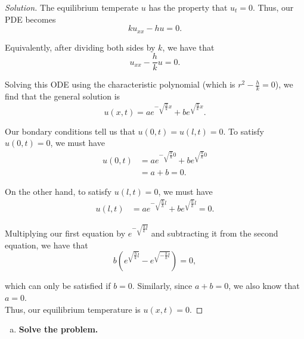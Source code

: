 \documentclass[11pt]{article}
\newenvironment{solution}
  {\renewcommand\qedsymbol{$\blacksquare$}\begin{proof}[Solution]}
  {\end{proof}}
\begin{document}
\begin{solution}
The equilibrium temperate $u$ has the property that $u_t = 0$. Thus, our PDE becomes
\[ ku_{xx} - hu = 0.\]

Equivalently, after dividing both sides by $k$, we have that \[ u_{xx} - \frac{h}{k} u = 0. \]

Solving this ODE using the characteristic polynomial (which is $r^2 - \frac{h}{k} = 0$), we find that the general solution is 
\[ u(x, t) = a e^{-\sqrt{\frac{h}{k}}x} + b e^{\sqrt{\frac{h}{k}}x}.\]

Our bondary conditions tell us that $u(0, t) = u(l, t) = 0$. To satisfy $u(0, t) = 0$, we must have
\begin{align*} u(0, t) &= a e^{-\sqrt{\frac{h}{k}}0} + b e^{\sqrt{\frac{h}{k}}0} \\
&= a + b = 0.\end{align*} 

On the other hand, to satisfy $u(l, t) = 0$, we must have
\begin{align*} u(l, t) &= a e^{-\sqrt{\frac{h}{k}}l} + b e^{\sqrt{\frac{h}{k}}l} = 0.\end{align*}

Multiplying our first equation by $e^{-\sqrt{\frac{h}{k}l}}$ and subtracting it from the second equation, we have that
\[ b\left(e^{\sqrt{\frac{h}{k}l}} - e^{\sqrt{-\frac{h}{k}l}}\right) = 0,\]

which can only be satisfied if $b=0$. Similarly, since $a+b=0$, we also know that $a=0$. \\

Thus, our equilibrium temperature is $u(x, t) = \boxed{0}.$

\end{solution}

\begin{enumerate}[b)]
  \item \textbf{Solve the problem.}

\end{enumerate}
\end{document}
